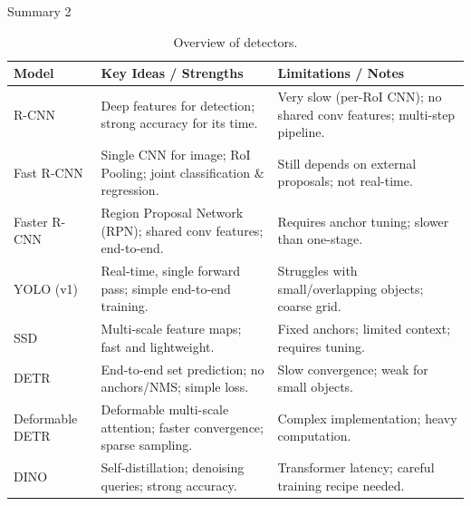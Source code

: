 \documentclass[xcolor=dvipsnames,aspectratio=169]{beamer}
\begin{document}
    \begin{frame}{Summary 2}
        \begin{table}
            \tiny
            \setlength{\tabcolsep}{3pt}
            \renewcommand{\arraystretch}{1.35}
            \begin{tabular}{|l|p{5.5cm}|p{5.5cm}|}
                \hline
                \textbf{Model} & \textbf{Key Ideas / Strengths} & \textbf{Limitations / Notes} \\
                \hline
                R-CNN & Deep features for detection; strong accuracy for its time. & Very slow (per-RoI CNN); no shared conv features; multi-step pipeline. \\
                \hline
                Fast R-CNN & Single CNN for image; RoI Pooling; joint classification \& regression. & Still depends on external proposals; not real-time. \\
                \hline
                Faster R-CNN & Region Proposal Network (RPN); shared conv features; end-to-end. & Requires anchor tuning; slower than one-stage. \\
                \hline
                YOLO (v1) & Real-time, single forward pass; simple end-to-end training. & Struggles with small/overlapping objects; coarse grid. \\
                \hline
                SSD & Multi-scale feature maps; fast and lightweight. & Fixed anchors; limited context; requires tuning. \\
                \hline
                DETR & End-to-end set prediction; no anchors/NMS; simple loss. & Slow convergence; weak for small objects. \\
                \hline
                Deformable DETR & Deformable multi-scale attention; faster convergence; sparse sampling. & Complex implementation; heavy computation. \\
                \hline
                DINO & Self-distillation; denoising queries; strong accuracy. & Transformer latency; careful training recipe needed. \\
                \hline
            \end{tabular}
            \caption{Overview of detectors.}
        \end{table}
    \end{frame}
\end{document}
